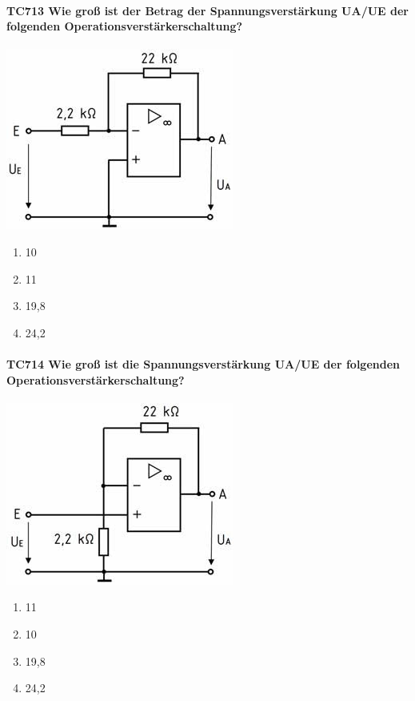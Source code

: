 \documentclass[8pt]{article}
\begin{document}
\begin{enumerate}
\begin{enumerate}[nolistsep,label=\Alph*]
{\begin{enumerate}[nolistsep,label=\Alph*]
\paragraph*{TC713 Wie groß ist der Betrag der Spannungsverstärkung UA/UE der folgenden Operationsverstärkerschaltung?}
\begin{center}
	\begin{minipage}{\linewidth}
		\centering
		\includegraphics[scale=1.0]{pics/tc713_a.jpg}
	\end{minipage}
\end{center}
\begin{enumerate}[nolistsep,label=\Alph*]
\item 10
\item 11
\item 19,8
\item 24,2
\end{enumerate}

\paragraph*{TC714 Wie groß ist die Spannungsverstärkung UA/UE der folgenden Operationsverstärkerschaltung?}
\begin{center}
	\begin{minipage}{\linewidth}
		\centering
		\includegraphics[scale=1.0]{pics/tc714_a.jpg}
	\end{minipage}
\end{center}
\begin{enumerate}[nolistsep,label=\Alph*]
\item 11
\item 10
\item 19,8
\item 24,2
\end{enumerate}


\end{enumerate}}
\end{enumerate}
\end{enumerate}
\end{document}
